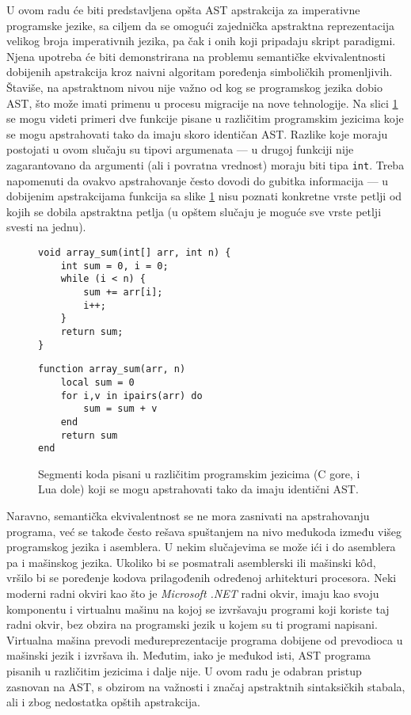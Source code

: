 U ovom radu će biti predstavljena opšta AST apstrakcija za imperativne programske jezike, sa ciljem da se omogući zajednička apstraktna reprezentacija velikog broja imperativnih jezika, pa čak i onih koji pripadaju skript paradigmi. Njena upotreba će biti demonstrirana na problemu semantičke ekvivalentnosti dobijenih apstrakcija kroz naivni algoritam poređenja simboličkih promenljivih. Štaviše, na apstraktnom nivou nije važno od kog se programskog jezika dobio AST, što može imati primenu u procesu migracije na nove tehnologije. Na slici \ref{fig:IntroExample} se mogu videti primeri dve funkcije pisane u različitim programskim jezicima koje se mogu apstrahovati tako da imaju skoro identičan AST. Razlike koje moraju postojati u ovom slučaju su tipovi argumenata --- u drugoj funkciji nije zagarantovano da argumenti (ali i povratna vrednost) moraju biti tipa \texttt{int}. Treba napomenuti da ovakvo apstrahovanje često dovodi do gubitka informacija --- u dobijenim apstrakcijama funkcija sa slike \ref{fig:IntroExample} nisu poznati konkretne vrste petlji od kojih se dobila apstraktna petlja (u opštem slučaju je moguće sve vrste petlji svesti na jednu).

\begin{figure}[h!]
\begin{lstlisting}
void array_sum(int[] arr, int n) {
    int sum = 0, i = 0;
    while (i < n) {
        sum += arr[i];
        i++;
    }
    return sum;
}
\end{lstlisting}
\begin{lstlisting}
function array_sum(arr, n)
    local sum = 0
    for i,v in ipairs(arr) do
        sum = sum + v
    end
    return sum
end
\end{lstlisting}
\caption{Segmenti koda pisani u različitim programskim jezicima (C gore, i Lua dole) koji se mogu apstrahovati tako da imaju identični AST.}
\label{fig:IntroExample}
\end{figure}

Naravno, semantička ekvivalentnost se ne mora zasnivati na apstrahovanju programa, već se takođe često rešava spuštanjem na nivo međukoda između višeg programskog jezika i asemblera. U nekim slučajevima se može ići i do asemblera pa i mašinskog jezika. Ukoliko bi se posmatrali asemblerski ili mašinski k\^od, vršilo bi se poređenje kodova prilagođenih određenoj arhitekturi procesora. Neki moderni radni okviri kao što je \emph{Microsoft .NET} radni okvir, imaju kao svoju komponentu i virtualnu mašinu na kojoj se izvršavaju programi koji koriste taj radni okvir, bez obzira na programski jezik u kojem su ti programi napisani. Virtualna mašina prevodi međureprezentacije  programa dobijene od prevodioca u mašinski jezik i izvršava ih. Međutim, iako je međukod isti, AST programa pisanih u različitim jezicima i dalje nije. U ovom radu je odabran pristup zasnovan na AST, s obzirom na važnosti i značaj apstraktnih sintaksičkih stabala, ali i zbog nedostatka opštih apstrakcija.

